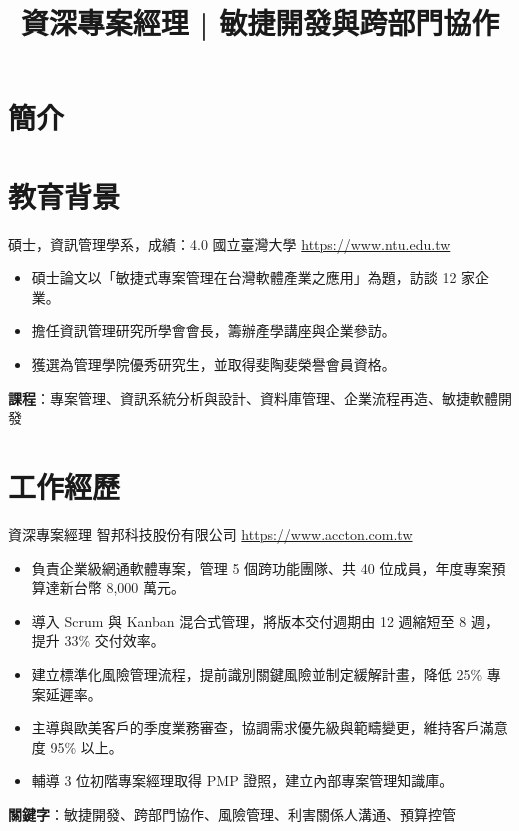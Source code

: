 \documentclass[a4paper, serif, 10pt]{moderncv}
\title{資深專案經理 | 敏捷開發與跨部門協作}
\begin{document}
\maketitle

\section{簡介}

\section{教育背景}

        {碩士，資訊管理學系，成績：4.0}
        {國立臺灣大學}
        {\url{https://www.ntu.edu.tw}}
        {}
        {\begin{itemize}
\item 碩士論文以「敏捷式專案管理在台灣軟體產業之應用」為題，訪談 12 家企業。
\item 擔任資訊管理研究所學會會長，籌辦產學講座與企業參訪。
\item 獲選為管理學院優秀研究生，並取得斐陶斐榮譽會員資格。
\end{itemize}
\textbf{課程}：專案管理、資訊系統分析與設計、資料庫管理、企業流程再造、敏捷軟體開發}
\section{工作經歷}

        {資深專案經理}
        {智邦科技股份有限公司}
        {\url{https://www.accton.com.tw}}
        {}
        {\begin{itemize}
\item 負責企業級網通軟體專案，管理 5 個跨功能團隊、共 40 位成員，年度專案預算達新台幣 8,000 萬元。
\item 導入 Scrum 與 Kanban 混合式管理，將版本交付週期由 12 週縮短至 8 週，提升 33\% 交付效率。
\item 建立標準化風險管理流程，提前識別關鍵風險並制定緩解計畫，降低 25\% 專案延遲率。
\item 主導與歐美客戶的季度業務審查，協調需求優先級與範疇變更，維持客戶滿意度 95\% 以上。
\item 輔導 3 位初階專案經理取得 PMP 證照，建立內部專案管理知識庫。
\end{itemize}
\textbf{關鍵字}：敏捷開發、跨部門協作、風險管理、利害關係人溝通、預算控管}
\end{document}
